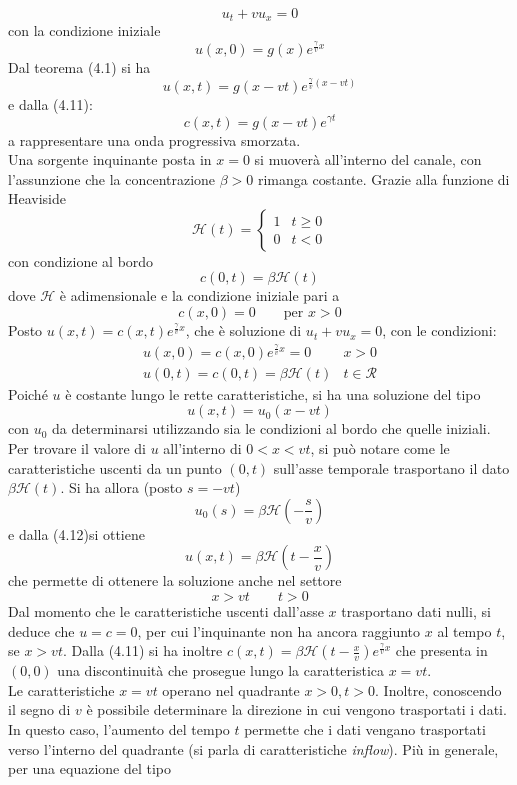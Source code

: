 \documentclass[a4paper,12pt, draft]{article}
\theoremstyle{break}
\numberwithin{equation}{section}
\begin{document}
\[
  u_t + v u_x = 0
\]
con la condizione iniziale
\[
  u(x, 0) = g(x)e^{\frac{\gamma}{v} x}
\] 
Dal teorema (4.1) si ha 
\[
  u(x,t) = g(x-vt)e^{\frac{\gamma}{v}(x-vt)}
\]
e dalla (4.11):
\[
  c(x,t) = g(x-vt) e^{\gamma t}
\]
a rappresentare una onda progressiva smorzata. \\
Una sorgente inquinante posta in \(x = 0\) si muoverà all'interno del canale, con l'assunzione che la concentrazione \(\beta > 0\) rimanga costante. Grazie alla funzione di Heaviside 
\[
  \mathcal{H}(t) =
\begin{cases}
1 & t\geq 0 \\
0 & t < 0
\end{cases}  
\]
con condizione al bordo
\[
c(0, t) = \beta\mathcal{H}(t) 
\]
dove \(\mathcal{H}\) è adimensionale e la condizione iniziale pari a
\[
c(x,0) = 0 \qquad \mbox{per }x>0
\]
Posto \(u(x,t) = c(x,t)e^{\frac{\gamma}{v} x}\), che è soluzione di \(u_t + vu_x = 0\), con le condizioni:
\begin{eqnarray*}
  u(x,0) = c(x,0)e^{\frac{\gamma}{v} x} = 0 & x > 0 \\
  u(0,t) = c(0,t) = \beta\mathcal{H}(t) & t \in \mathcal{R}
\end{eqnarray*}
Poiché \(u\) è costante lungo le rette caratteristiche, si ha una soluzione del tipo
\begin{equation}
  u(x,t) = u_0 (x-vt)
\end{equation}
con \(u_0\) da determinarsi utilizzando sia le condizioni al bordo che quelle iniziali. \\
Per trovare il valore di \(u\) all'interno di \(0 < x < vt\), si può notare come le caratteristiche uscenti da un punto $(0,t)$ sull'asse temporale trasportano il dato \(\beta\mathcal{H}(t)\). Si ha allora (posto \(s = -vt\))
\[
  u_0(s) = \beta\mathcal{H}\left(-\frac{s}{v}\right)  
\]
e dalla (4.12)si ottiene 
\[
  u(x,t) = \beta\mathcal{H}\left(t - \frac{x}{v}\right)
\]
che permette di ottenere la soluzione anche nel settore
\[
x > vt \qquad t > 0  
\]
Dal momento che le caratteristiche uscenti dall'asse \(x\) trasportano dati nulli, si deduce che \(u = c = 0\), per cui l'inquinante non ha ancora raggiunto \(x\) al tempo \(t\), se \(x > vt\). 
Dalla (4.11) si ha inoltre
\(
  c(x, t) = \beta\mathcal{H}\left(t - \frac{x}{v}\right)e^{\frac{\gamma}{v} x}
\)
che presenta in \((0,0)\) una discontinuità che prosegue lungo la caratteristica \(x = vt\). \\
Le caratteristiche \(x = vt\) operano nel quadrante \(x > 0, t > 0\). Inoltre, conoscendo il segno di \(v\) è possibile determinare la direzione in cui vengono trasportati i dati. In questo caso, l'aumento del tempo \(t\) permette che i dati vengano trasportati verso l'interno del quadrante (si parla di caratteristiche \emph{inflow}). Più in generale, per una equazione del tipo 
\end{document}
